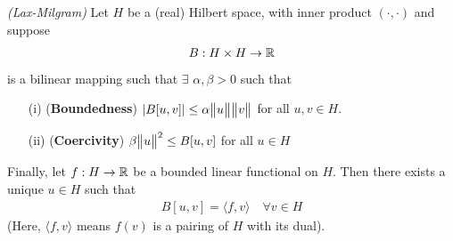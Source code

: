 \documentclass[12pt,a4paper]{report}
\begin{document}
\thm \emph{(Lax-Milgram)} Let $H$ be a (real) Hilbert space, with inner product $(\cdot, \cdot)$ and suppose
\begin{align*}
B : H\times H \rightarrow \mathbb{R}
\end{align*}
is a bilinear mapping such that $\exists$ $\alpha, \beta >0$ such that
\begin{itemize}
\item[(i)] (\textbf{Boundedness}) $|B[u,v]| \leq \alpha \bigl\lVert u\bigr\rVert_{} \bigl\lVert v\bigr\rVert_{}$ for all $u,v \in H$. 
\item[(ii)] (\textbf{Coercivity}) $\beta \bigl\lVert u\bigr\rVert_{}^2 \leq B[u,v]$ for all $u \in H$ 
\end{itemize}
Finally, let $f: H\rightarrow \mathbb{R}$ be a bounded linear functional on $H$. Then there exists a unique $u\in H$ such that
\begin{align*}
B[u,v] = \langle f, v\rangle \quad \forall v \in H
\end{align*}
(Here, $\langle f,v\rangle$ means $f(v)$ is a pairing of $H$ with its dual).
\end{document}
